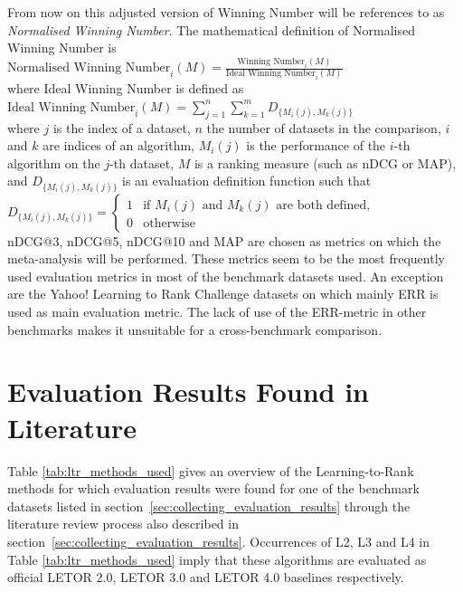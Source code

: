 From now on this adjusted version of Winning Number will be references to as \emph{Normalised Winning Number}. The mathematical definition of Normalised Winning Number is\\

$\text{Normalised Winning Number}_i(M) = \frac{\text{Winning Number}_i(M)}{\text{Ideal Winning Number}_i(M)}$\\

\noindent
where Ideal Winning Number is defined as\\

$\text{Ideal Winning Number}_i(M) = \sum\nolimits_{j=1}^n \sum\nolimits_{k=1}^m D_{\{M_i(j),M_k(j)\}}$\\

where $j$ is the index of a dataset, $n$ the number of datasets in the comparison, $i$ and $k$ are indices of an algorithm, $M_i(j)$ is the performance of the $i$-th algorithm on the $j$-th dataset, $M$ is a ranking measure (such as \ac{nDCG} or \ac{MAP}), and $D_{\{M_i(j),M_k(j)\}}$ is an evaluation definition function such that\\

$D_{\{M_i(j),M_k(j)\}} = \begin{cases}
1 & \text{if } M_i(j) \text{ and } M_k(j) \text{ are both defined}, \\
0 & \text{otherwise}
\end{cases}$\\

\acs{nDCG}@3, \acs{nDCG}@5, \acs{nDCG}@10 and \acs{MAP} are chosen as metrics on which the meta-analysis will be performed. These metrics seem to be the most frequently used evaluation metrics in most of the benchmark datasets used. An exception are the Yahoo! Learning to Rank Challenge datasets on which mainly \ac{ERR} is used as main evaluation metric. The lack of use of the \ac{ERR}-metric in other benchmarks makes it unsuitable for a cross-benchmark comparison.

\section{Evaluation Results Found in Literature}
Table \ref{tab:ltr_methods_used} gives an overview of the Learning-to-Rank methods for which evaluation results were found for one of the benchmark datasets listed in section~\ref{sec:collecting_evaluation_results} through the literature review process also described in section~\ref{sec:collecting_evaluation_results}. Occurrences of L2, L3 and L4 in Table \ref{tab:ltr_methods_used} imply that these algorithms are evaluated as official LETOR 2.0, LETOR 3.0 and LETOR 4.0 baselines respectively.\\

